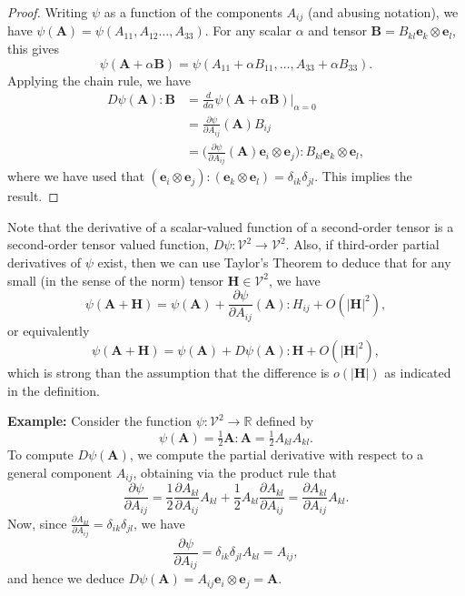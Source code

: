 \documentclass[
  letterpaper,
  DIV=11,
  numbers=noendperiod]{scrreprt}
\theoremstyle{plain}
\theoremstyle{remark}
\begin{document}
\begin{proof}
Writing \(\psi\) as a function of the components \(A_{ij}\) (and abusing
notation), we have
\(\psi({\boldsymbol{A}}) = \psi(A_{11},A_{12}\ldots,A_{33})\). For any
scalar \(\alpha\) and tensor
\({\boldsymbol{B}}=B_{kl}{\boldsymbol{e}}_k\otimes {\boldsymbol{e}}_l\),
this gives
\[\psi({\boldsymbol{A}}+\alpha{\boldsymbol{B}})=\psi(A_{11}+\alpha B_{11},\ldots,A_{33}+\alpha B_{33}).\]
Applying the chain rule, we have \[
\begin{aligned}
    D\psi({\boldsymbol{A}}):{\boldsymbol{B}}&= \frac{d}{d\alpha} \psi({\boldsymbol{A}}+\alpha{\boldsymbol{B}})\bigg|_{\alpha=0}\\
                     &= \frac{\partial \psi}{\partial A_{ij}}({\boldsymbol{A}})B_{ij}\\
                     &= \bigg(\frac{\partial \psi}{\partial A_{ij}}({\boldsymbol{A}}){\boldsymbol{e}}_i\otimes{\boldsymbol{e}}_j\bigg):B_{kl}{\boldsymbol{e}}_k\otimes{\boldsymbol{e}}_l,
\end{aligned}
\] where we have used that
\(({\boldsymbol{e}}_i\otimes{\boldsymbol{e}}_j):({\boldsymbol{e}}_k\otimes{\boldsymbol{e}}_l)=\delta_{ik}\delta_{jl}\).
This implies the result.
\end{proof}

Note that the derivative of a scalar-valued function of a second-order
tensor is a second-order tensor valued function,
\(D\psi:{\mathcal{V}}^2\to{\mathcal{V}}^2\). Also, if third-order
partial derivatives of \(\psi\) exist, then we can use Taylor's Theorem
to deduce that for any small (in the sense of the norm) tensor
\({\boldsymbol{H}}\in{\mathcal{V}}^2\), we have
\[\psi({\boldsymbol{A}}+{\boldsymbol{H}})=\psi({\boldsymbol{A}})+\frac{\partial \psi}{\partial A_{ij}}({\boldsymbol{A}}):H_{ij}+{O}(|{\boldsymbol{H}}|^2),\]
or equivalently
\[\psi({\boldsymbol{A}}+{\boldsymbol{H}})=\psi({\boldsymbol{A}})+D\psi({\boldsymbol{A}}):{\boldsymbol{H}}+{O}(|{\boldsymbol{H}}|^2),\]
which is strong than the assumption that the difference is
\({o}(|{\boldsymbol{H}}|)\) as indicated in the definition.

\textbf{Example:} Consider the function
\(\psi:{\mathcal{V}}^2\to{\mathbb{R}}\) defined by
\[\psi({\boldsymbol{A}})=\tfrac12 {\boldsymbol{A}}:{\boldsymbol{A}}= \tfrac12 A_{kl}A_{kl}.\]
To compute \(D\psi({\boldsymbol{A}})\), we compute the partial
derivative with respect to a general component \(A_{ij}\), obtaining via
the product rule that
\[\frac{\partial \psi}{\partial A_{ij}} = \frac12\frac{\partial A_{kl}}{\partial A_{ij}}A_{kl}+
  \frac12A_{kl}\frac{\partial A_{kl}}{\partial A_{ij}}=\frac{\partial A_{kl}}{\partial A_{ij}}A_{kl}.\]
Now, since
\(\frac{\partial A_{kl}}{\partial A_{ij}}=\delta_{ik}\delta_{jl}\), we
have
\[\frac{\partial \psi}{\partial A_{ij}} = \delta_{ik}\delta_{jl}A_{kl} = A_{ij},\]
and hence we deduce
\(D\psi({\boldsymbol{A}}) = A_{ij}{\boldsymbol{e}}_i\otimes{\boldsymbol{e}}_j = {\boldsymbol{A}}\).
\end{document}
